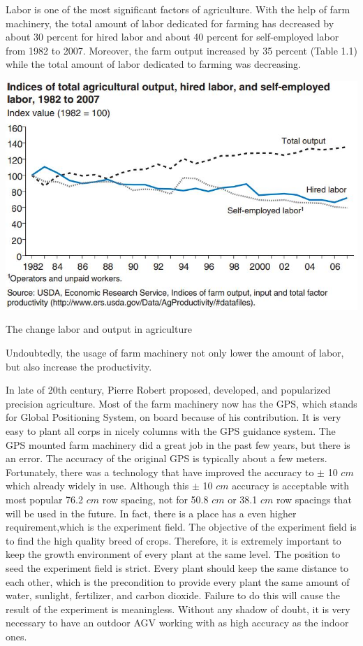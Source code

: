 \documentclass[letterpaper,12pt,oneside]{book}
\begin{document}
		Labor is one of the most significant factors of agriculture. With the help of farm machinery, the total amount of labor dedicated for farming has decreased by about 30 percent for hired labor and about 40 percent for self-employed labor from 1982 to 2007. Moreover, the farm output increased by 35 percent (Table 1.1) while the total amount of labor dedicated to farming was decreasing. \cite{o2011changing} %
		\begin{table}[ht!]
			\begin{center}
				\includegraphics[scale = 0.7]{laborandoutput.jpg}
				\caption{The change labor and output in agriculture}
			\end{center}
		\end{table}
		Undoubtedly, the usage of farm machinery not only lower the amount of labor, but also increase the productivity. 
		
		In late of 20th century, Pierre Robert proposed, developed, and popularized precision agriculture. \cite{mcbratney2005future} Most of the farm machinery now has the GPS, which stands for Global Positioning System, on board because of his contribution. It is very easy to plant all corps in nicely columns with the GPS guidance system. The GPS mounted farm machinery did a great job in the past few years, but there is an error. The accuracy of the original GPS is typically about a few meters. Fortunately, there was a technology that have improved the accuracy to $\pm$ 10 $cm$ which already widely in use. \cite{thuilot2002automatic} Although this $\pm$ 10 $cm$ accuracy is acceptable with most popular 76.2 $cm$ row spacing, not for 50.8 $cm$ or 38.1 $cm$ row spacings that will be used in the future. \cite{fawcett2014farm} In fact, there is a place has a even higher requirement,which is the experiment field. The objective of the experiment field is to find the high quality breed of crops. Therefore, it is extremely important to keep the growth environment of every plant at the same level. The position to seed the experiment field is strict. Every plant should keep the same distance to each other, which is the precondition to provide every plant the same amount of water, sunlight, fertilizer, and carbon dioxide. Failure to do this will cause the result of the experiment is meaningless. Without any shadow of doubt, it is very necessary to have an outdoor AGV working with as high accuracy as the indoor ones.
		
\end{document}
